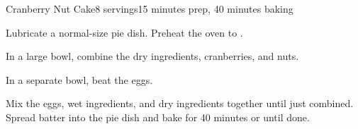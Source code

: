 \documentclass[../Cookbook.tex]{subfiles}
\begin{document}
\begin{recipe}{Cranberry Nut Cake}{8 servings}{15 minutes prep, 40 minutes baking}

Lubricate a normal-size pie dish. Preheat the oven to .

In a large bowl, combine the dry ingredients, cranberries, and nuts.

In a separate bowl, beat the eggs.

Mix the eggs, wet ingredients, and dry ingredients together until just combined. Spread batter into the pie dish and bake for 40 minutes or until done.

\end{recipe}
\end{document}
